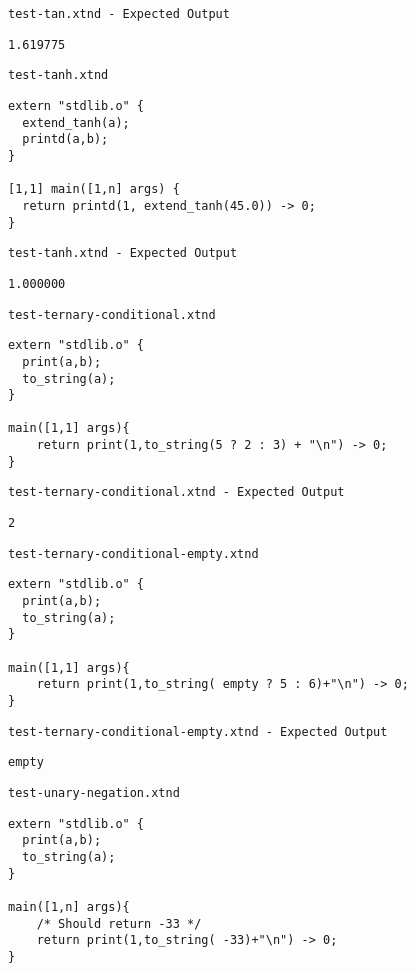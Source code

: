 \medskip \noindent \texttt{test-tan.xtnd - Expected Output}


\begin{lstlisting}
1.619775
\end{lstlisting}


\medskip \noindent \texttt{test-tanh.xtnd}


\begin{lstlisting}
extern "stdlib.o" {
  extend_tanh(a);
  printd(a,b);
}

[1,1] main([1,n] args) {
  return printd(1, extend_tanh(45.0)) -> 0;
}
\end{lstlisting}


\medskip \noindent \texttt{test-tanh.xtnd - Expected Output}


\begin{lstlisting}
1.000000
\end{lstlisting}


\medskip \noindent \texttt{test-ternary-conditional.xtnd}


\begin{lstlisting}
extern "stdlib.o" {
  print(a,b);
  to_string(a);
}

main([1,1] args){
	return print(1,to_string(5 ? 2 : 3) + "\n") -> 0;
}
\end{lstlisting}


\medskip \noindent \texttt{test-ternary-conditional.xtnd - Expected Output}


\begin{lstlisting}
2
\end{lstlisting}


\medskip \noindent \texttt{test-ternary-conditional-empty.xtnd}


\begin{lstlisting}
extern "stdlib.o" {
  print(a,b);
  to_string(a);
}

main([1,1] args){
	return print(1,to_string( empty ? 5 : 6)+"\n") -> 0;
}
\end{lstlisting}


\medskip \noindent \texttt{test-ternary-conditional-empty.xtnd - Expected Output}


\begin{lstlisting}
empty
\end{lstlisting}


\medskip \noindent \texttt{test-unary-negation.xtnd}


\begin{lstlisting}
extern "stdlib.o" {
  print(a,b);
  to_string(a);
}

main([1,n] args){
	/* Should return -33 */
	return print(1,to_string( -33)+"\n") -> 0;
}
\end{lstlisting}


